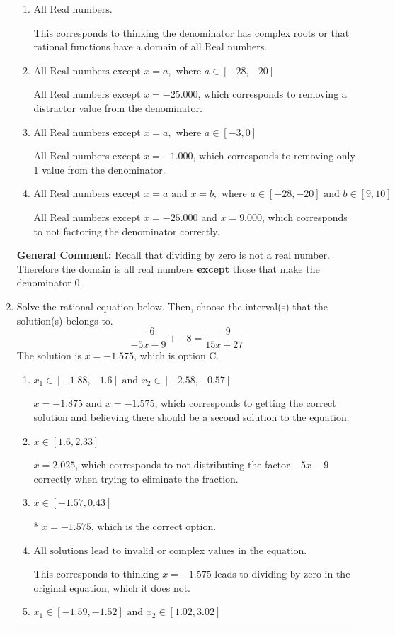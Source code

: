 \documentclass{extbook}[14pt]
\newcommand{\litem}[1]{\item #1

\rule{\textwidth}{0.4pt}}
\begin{document}
\begin{enumerate}
{\begin{enumerate}[label=\Alph*.]
All Real numbers except $x = -1.000$ and $x = 1.000$, which is the correct option.
\item \( \text{All Real numbers.} \)

This corresponds to thinking the denominator has complex roots or that rational functions have a domain of all Real numbers.
\item \( \text{All Real numbers except } x = a, \text{ where } a \in [-28, -20] \)

All Real numbers except $x = -25.000$, which corresponds to removing a distractor value from the denominator.
\item \( \text{All Real numbers except } x = a, \text{ where } a \in [-3, 0] \)

All Real numbers except $x = -1.000$, which corresponds to removing only 1 value from the denominator.
\item \( \text{All Real numbers except } x = a \text{ and } x = b, \text{ where } a \in [-28, -20] \text{ and } b \in [9, 10] \)

All Real numbers except $x = -25.000$ and $x = 9.000$, which corresponds to not factoring the denominator correctly.
\end{enumerate}

\textbf{General Comment:} Recall that dividing by zero is not a real number. Therefore the domain is all real numbers \textbf{except} those that make the denominator 0.
}
\litem{
Solve the rational equation below. Then, choose the interval(s) that the solution(s) belongs to.
\[ \frac{-6}{-5x -9} + -8 = \frac{-9}{15x + 27} \]
The solution is \( x = -1.575 \), which is option C.\begin{enumerate}[label=\Alph*.]
\item \( x_1 \in [-1.88, -1.6] \text{ and } x_2 \in [-2.58,-0.57] \)

$x = -1.875 \text{ and } x = -1.575$, which corresponds to getting the correct solution and believing there should be a second solution to the equation.
\item \( x \in [1.6,2.33] \)

$x = 2.025$, which corresponds to not distributing the factor $-5x -9$ correctly when trying to eliminate the fraction.
\item \( x \in [-1.57,0.43] \)

* $x = -1.575$, which is the correct option.
\item \( \text{All solutions lead to invalid or complex values in the equation.} \)

This corresponds to thinking $x = -1.575$ leads to dividing by zero in the original equation, which it does not.
\item \( x_1 \in [-1.59, -1.52] \text{ and } x_2 \in [1.02,3.02] \)


\end{enumerate}}
\end{enumerate}
\end{document}
